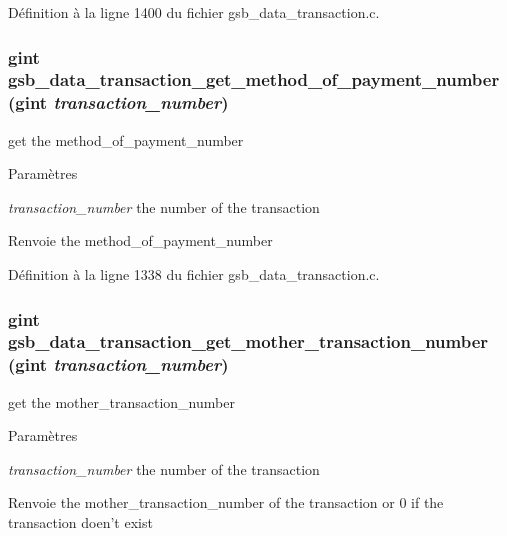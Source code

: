 Définition à la ligne 1400 du fichier gsb\_\-data\_\-transaction.c.

\subsubsection[{gsb\_\-data\_\-transaction\_\-get\_\-method\_\-of\_\-payment\_\-number}]{\setlength{\rightskip}{0pt plus 5cm}gint gsb\_\-data\_\-transaction\_\-get\_\-method\_\-of\_\-payment\_\-number (gint {\em transaction\_\-number})}\label{gsb__data__transaction_8h_aa9bc2b3aba6d0a4df30e0584ab56ede0}
get the method\_\-of\_\-payment\_\-number 
\begin{DoxyParams}{Paramètres}
\item[{\em transaction\_\-number}]the number of the transaction\end{DoxyParams}
\begin{DoxyReturn}{Renvoie}
the method\_\-of\_\-payment\_\-number 
\end{DoxyReturn}


Définition à la ligne 1338 du fichier gsb\_\-data\_\-transaction.c.

\subsubsection[{gsb\_\-data\_\-transaction\_\-get\_\-mother\_\-transaction\_\-number}]{\setlength{\rightskip}{0pt plus 5cm}gint gsb\_\-data\_\-transaction\_\-get\_\-mother\_\-transaction\_\-number (gint {\em transaction\_\-number})}\label{gsb__data__transaction_8h_a6018560ece7ab02e8d46bc9bdaffd607}
get the mother\_\-transaction\_\-number


\begin{DoxyParams}{Paramètres}
\item[{\em transaction\_\-number}]the number of the transaction\end{DoxyParams}
\begin{DoxyReturn}{Renvoie}
the mother\_\-transaction\_\-number of the transaction or 0 if the transaction doen't exist 
\end{DoxyReturn}


